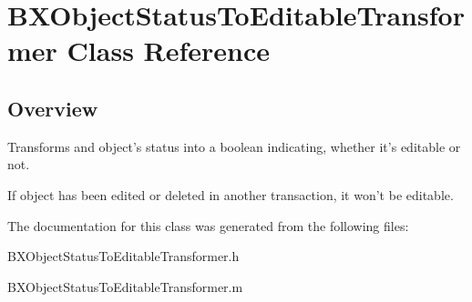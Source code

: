\hypertarget{interface_b_x_object_status_to_editable_transformer}{}\section{B\+X\+Object\+Status\+To\+Editable\+Transformer Class Reference}
\label{interface_b_x_object_status_to_editable_transformer}


\subsection{Overview}
Transforms and object's status into a boolean indicating, whether it's editable or not. 

If object has been edited or deleted in another transaction, it won't be editable. 

The documentation for this class was generated from the following files\+:\begin{DoxyCompactItemize}
\item 
B\+X\+Object\+Status\+To\+Editable\+Transformer.\+h\item 
B\+X\+Object\+Status\+To\+Editable\+Transformer.\+m\end{DoxyCompactItemize}
